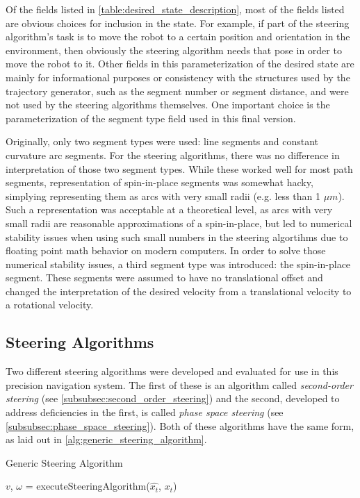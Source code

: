 Of the fields listed in \autoref{table:desired_state_description}, most of the fields listed are obvious choices for inclusion in the state. For example, if part of the steering algorithm's task is to move the robot to a certain position and orientation in the environment, then obviously the steering algorithm needs that pose in order to move the robot to it. Other fields in this parameterization of the desired state are mainly for informational purposes or consistency with the structures used by the trajectory generator, such as the segment number or segment distance, and were not used by the steering algorithms themselves. One important choice is the parameterization of the segment type field used in this final version.

Originally, only two segment types were used: line segments and constant curvature arc segments. For the steering algorithms, there was no difference in interpretation of those two segment types. While these worked well for most path segments, representation of spin-in-place segments was somewhat hacky, simplying representing them as arcs with very small radii (e.g. less than 1 $\mu m$). Such a representation was acceptable at a theoretical level, as arcs with very small radii are reasonable approximations of a spin-in-place, but led to numerical stability issues when using such small numbers in the steering algortihms due to floating point math behavior on modern computers. In order to solve those numerical stability issues, a third segment type was introduced: the spin-in-place segment. These segments were assumed to have no translational offset and changed the interpretation of the desired velocity from a translational velocity to a rotational velocity.

\subsection{Steering Algorithms}\label{subsec:steering_algorithms}

Two different steering algorithms were developed and evaluated for use in this precision navigation system. The first of these is an algorithm called \emph{second-order steering} (see \autoref{subsubsec:second_order_steering}) and the second, developed to address deficiencies in the first, is called \emph{phase space steering} (see \autoref{subsubsec:phase_space_steering}). Both of these algorithms have the same form, as laid out in \autoref{alg:generic_steering_algorithm}.

\begin{algorithm}
\caption{Generic Steering Algorithm}
\label{alg:generic_steering_algorithm}
\DontPrintSemicolon


$v$, $\omega$ = executeSteeringAlgorithm($\hat{x_t}$, $x_t$)\;

\end{algorithm}

